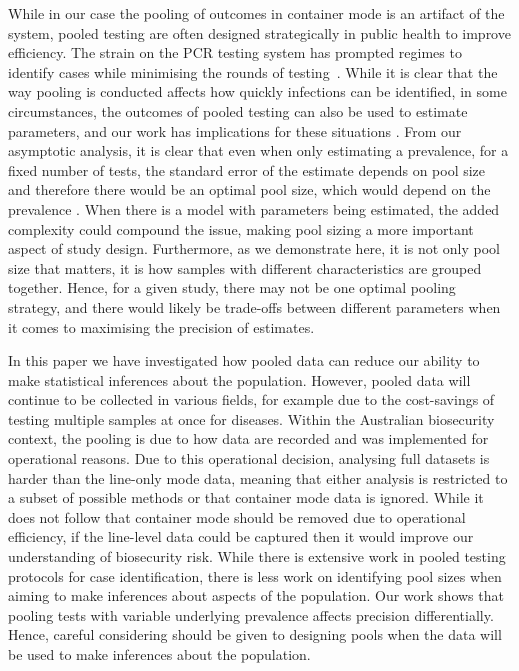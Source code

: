 \documentclass[aoas]{imsart}
\begin{document}
While in our case the pooling of outcomes in container mode is an artifact of the system, pooled testing are often designed strategically in public health to improve efficiency. The strain on the PCR testing system has prompted regimes to identify cases while minimising the rounds of testing~\cite{mutesa_pooled_2021}. While it is clear that the way pooling is conducted affects how quickly infections can be identified,  {in some circumstances, the outcomes of pooled testing can also be used to estimate parameters, and our work has implications for these situations} \cite{delaigle_nonparametric_2015, chatterjee_regression_2020, mcmahan_bayesian_2017, liu_generalized_2020}. From our asymptotic analysis, it is clear that even when only estimating a prevalence, for a fixed number of tests, the standard error of the estimate depends on pool size and therefore there would be an optimal pool size, which would depend on the prevalence  \cite{brynildsrud_covid-19_2020}. When there is a model with parameters being estimated, the added complexity could compound the issue, making pool sizing a more important aspect of study design. Furthermore, as we demonstrate here, it is not only pool size that matters, it is how samples with different characteristics are grouped together. Hence, for a given study, there may not be one optimal pooling strategy, and there would likely be trade-offs between different parameters when it comes to maximising the precision of estimates. 


 {In this paper we have investigated how pooled data can reduce our ability to make statistical inferences about the population. However, pooled data will continue to be collected in various fields, for example due to the cost-savings of testing multiple samples at once for diseases. Within the Australian biosecurity context, the pooling is due to how data are recorded and was implemented for operational reasons. Due to this operational decision, analysing full datasets is harder than the line-only mode data, meaning that either analysis is restricted to a subset of possible methods or that container mode data is ignored. While it does not follow that container mode should be removed due to operational efficiency, if the line-level data could be captured then it would improve our understanding of biosecurity risk. While there is extensive work in pooled testing protocols for case identification, there is less work on identifying pool sizes when aiming to make inferences about aspects of the population.
Our work shows that pooling tests with variable underlying prevalence affects precision differentially. Hence, careful considering should be given to designing pools when the data will be used to make inferences about the population.}
\end{document}
